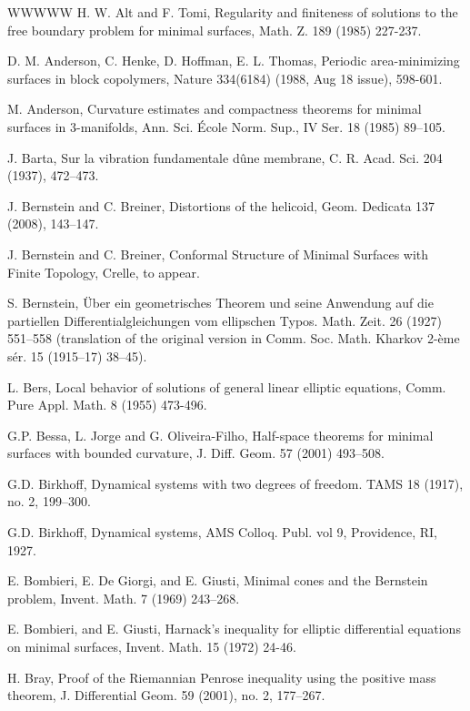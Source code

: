 \begin{thebibliography}{WWWWW}
 H. W. Alt and F. Tomi, Regularity and finiteness of solutions to the free boundary problem for minimal surfaces, Math. Z. 189 (1985) 227-237.

 D. M. Anderson, C. Henke, D. Hoffman, E. L. Thomas, Periodic area-minimizing surfaces in block copolymers, Nature 334(6184) (1988, Aug 18 issue), 598-601.

 M. Anderson, Curvature estimates and compactness theorems for minimal surfaces in 3-manifolds, Ann. Sci. École Norm. Sup., IV Ser. 18 (1985) 89–105.

 J. Barta, Sur la vibration fundamentale dûne membrane, C. R. Acad. Sci. 204 (1937), 472–473.

 J. Bernstein and C. Breiner, Distortions of the helicoid, Geom. Dedicata 137 (2008), 143–147.

 J. Bernstein and C. Breiner, Conformal Structure of Minimal Surfaces with Finite Topology, Crelle, to appear.

 S. Bernstein, Über ein geometrisches Theorem und seine Anwendung auf die partiellen Differentialgleichungen vom ellipschen Typos. Math. Zeit. 26 (1927) 551–558 (translation of the original version in Comm. Soc. Math. Kharkov 2-ème sér. 15 (1915–17) 38–45).

 L. Bers, Local behavior of solutions of general linear elliptic equations, Comm. Pure Appl. Math. 8 (1955) 473-496.

 G.P. Bessa, L. Jorge and G. Oliveira-Filho, Half-space theorems for minimal surfaces with bounded curvature, J. Diff. Geom. 57 (2001) 493–508.

 G.D. Birkhoff, Dynamical systems with two degrees of freedom. TAMS 18 (1917), no. 2, 199–300.

 G.D. Birkhoff, Dynamical systems, AMS Colloq. Publ. vol 9, Providence, RI, 1927.

 E. Bombieri, E. De Giorgi, and E. Giusti, Minimal cones and the Bernstein problem, Invent. Math. 7 (1969) 243–268.

 E. Bombieri, and E. Giusti, Harnack's inequality for elliptic differential equations on minimal surfaces, Invent. Math. 15 (1972) 24-46.

 H. Bray, Proof of the Riemannian Penrose inequality using the positive mass theorem, J. Differential Geom. 59 (2001), no. 2, 177–267.


\end{thebibliography}
